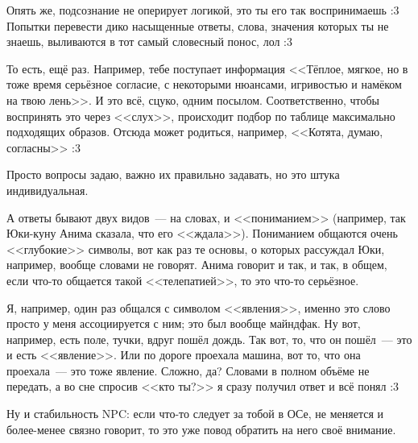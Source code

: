 \documentclass[a5paper,12pt,twoside]{memoir}
\begin{document}
Опять же, подсознание не оперирует логикой, это ты его так воспринимаешь :3 Попытки перевести дико насыщенные ответы, слова, значения которых ты не знаешь, выливаются в тот самый словесный понос, лол :3 

То есть, ещё раз. Например, тебе поступает информация <<Тёплое, мягкое, но в тоже время серьёзное согласие, с некоторыми нюансами, игривостью и намёком на твою лень>>. 
И это всё, сцуко, одним посылом. Соответственно, чтобы воспринять это через <<слух>>, происходит подбор по таблице максимально подходящих образов. Отсюда может родиться, например, <<Котята, думаю, согласны>> :3

\medskip


Просто вопросы задаю, важно их правильно задавать, но это штука индивидуальная. 

А ответы бывают двух видов~--- на словах, и <<пониманием>> (например, так Юки-куну Анима сказала, что его <<ждала>>). Пониманием общаются очень <<глубокие>> символы, вот как раз те основы, о которых рассуждал Юки, например, вообще словами не говорят. Анима говорит и так, и так, в общем, если что-то общается такой <<телепатией>>, то это что-то серьёзное.
 
Я, например, один раз общался с символом <<явления>>, именно это слово просто у меня ассоциируется с ним; это был вообще майндфак. Ну вот, например, есть поле, тучки, вдруг пошёл дождь. Так вот, то, что он пошёл~--- это и есть <<явление>>. Или по дороге проехала машина, вот то, что она проехала~--- это тоже явление. Сложно, да? Словами в полном объёме не передать, а во сне спросив <<кто ты?>> я сразу получил ответ и всё понял :3

Ну и стабильность NPC: если что-то следует за тобой в ОСе, не меняется и более-менее связно говорит, то это уже повод обратить на него своё внимание. 

\medskip

\end{document}
